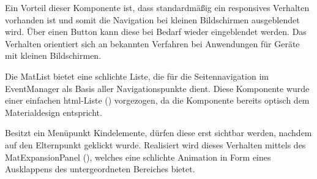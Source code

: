 Ein Vorteil dieser Komponente ist, dass standardmäßig ein responsives Verhalten vorhanden ist und somit die Navigation bei kleinen Bildschirmen ausgeblendet wird.
Über einen Button kann diese bei Bedarf wieder eingeblendet werden. Das Verhalten orientiert sich an bekannten Verfahren bei Anwendungen für Geräte mit kleinen Bildschirmen.




Die MatList bietet eine schlichte Liste, die für die Seitennavigation im EventManager als Basis aller Navigationspunkte dient.
Diese Komponente wurde einer einfachen \gls{html}-Liste () vorgezogen, da die Komponente bereits optisch dem Materialdesign entspricht.

\newpage

Besitzt ein Menüpunkt Kindelemente, dürfen diese erst sichtbar werden, nachdem auf den Elternpunkt geklickt wurde.
Realisiert wird dieses Verhalten mittels des MatExpansionPanel (), welches eine schlichte Animation in Form eines Ausklappens des untergeordneten Bereiches bietet.

